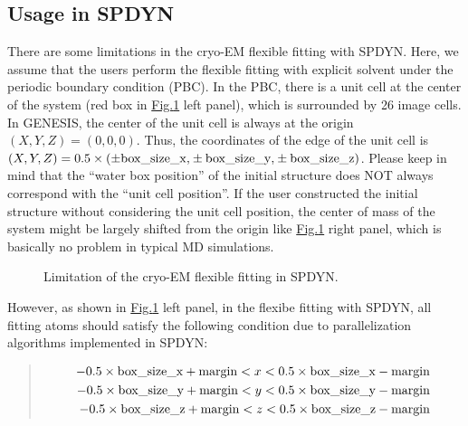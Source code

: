 \documentclass[a4paper,11pt,oneside,english]{sphinxmanual}
\begin{document}
\subsection{Usage in SPDYN}
\label{\detokenize{19_Experiments:usage-in-spdyn}}
There are some limitations in the cryo-EM flexible fitting with SPDYN.
Here, we assume that the users perform the flexible fitting with explicit solvent under the periodic boundary condition (PBC).
In the PBC, there is a unit cell at the center of the system (red box in \hyperref[\detokenize{19_Experiments:cryo-spdyn}]{Fig.\@ \ref{\detokenize{19_Experiments:cryo-spdyn}}} left panel), which is surrounded by 26 image cells.
In GENESIS, the center of the unit cell is always at the origin \((X,Y,Z) = (0,0,0)\).
Thus, the coordinates of the edge of the unit cell is \((X,Y,Z) = 0.5 \times ( \pm {\rm{box\_size\_x,}} \pm {\rm{box\_size\_y,}} \pm {\rm{box\_size\_z}})\).
Please keep in mind that the “water box position” of the initial structure does NOT always correspond with the “unit cell position”.
If the user constructed the initial structure without considering the unit cell position, the center of mass of the system
might be largely shifted from the origin like \hyperref[\detokenize{19_Experiments:cryo-spdyn}]{Fig.\@ \ref{\detokenize{19_Experiments:cryo-spdyn}}} right panel, which is basically no problem in typical MD simulations.

\begin{figure}[htbp]
\centering
\capstart

\noindent{}
\caption{Limitation of the cryo-EM flexible fitting in SPDYN.}\label{\detokenize{19_Experiments:cryo-spdyn}}\end{figure}

However, as shown in \hyperref[\detokenize{19_Experiments:cryo-spdyn}]{Fig.\@ \ref{\detokenize{19_Experiments:cryo-spdyn}}} left panel, in the flexibe fitting with SPDYN,
all fitting atoms should satisfy the following condition due to parallelization algorithms implemented in SPDYN:
\begin{quote}

\vspace{-5mm}
\begin{equation*}
\begin{split}{-0.5 \times {\rm{box\_size\_x}} + {\rm{margin}} < x < 0.5 \times {\rm{box\_size\_x}} - {\rm{margin}}}\\
{-0.5 \times {\rm{box\_size\_y}} + {\rm{margin}} < y < 0.5 \times {\rm{box\_size\_y}} - {\rm{margin}}}\\
{-0.5 \times {\rm{box\_size\_z}} + {\rm{margin}} < z < 0.5 \times {\rm{box\_size\_z}} - {\rm{margin}}}\end{split}
\end{equation*}
\vspace{-3mm}
\end{quote}
\end{document}
